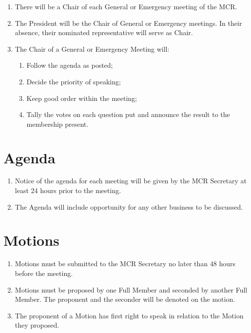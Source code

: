 \documentclass[11pt, a4paper]{article}
\begin{document}
\begin{enumerate}
	\item There will be a Chair of each General or Emergency meeting of the MCR.
    \item The President will be the Chair of General or Emergency meetings. In their absence, their nominated representative will serve as Chair.
    \item The Chair of a General or Emergency Meeting will:
    	\begin{enumerate}
        	\item Follow the agenda as posted;
            \item Decide the priority of speaking;
            \item Keep good order within the meeting;
            \item Tally the votes on each question put and announce the result to the membership present.
        \end{enumerate}
\end{enumerate}





\section{Agenda}
\label{sec:agenda}

\begin{enumerate}
	\item Notice of the agenda for each meeting will be given by the MCR Secretary at least 24 hours prior to the meeting.
    \item The Agenda will include opportunity for any other business to be discussed.
\end{enumerate}





\section{Motions}
\label{sec:motions}

\begin{enumerate}
	\item Motions must be submitted to the MCR Secretary no later than 48 hours before the meeting.
    \item Motions must be proposed by one Full Member and seconded by another Full Member. The proponent and the seconder will be denoted on the motion.
    \item The proponent of a Motion has first right to speak in relation to the Motion they proposed.
\end{enumerate}
\end{document}
